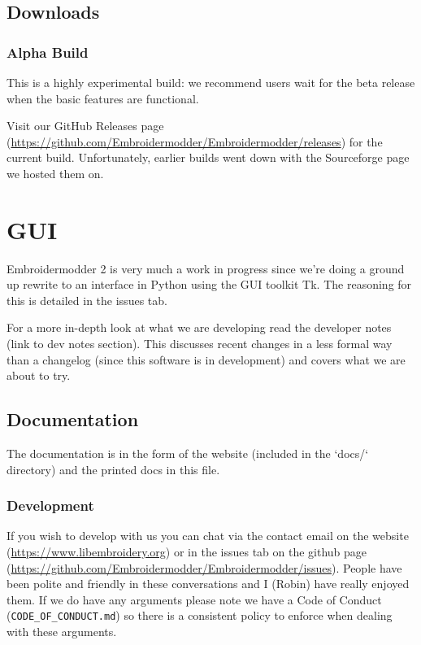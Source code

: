 \documentclass[10pt]{report}
\begin{document}
\section{Downloads}

\subsection{Alpha Build}

This is a highly experimental build: we recommend users wait for the beta
release when the basic features are functional.

Visit our  GitHub Releases page
(\url{https://github.com/Embroidermodder/Embroidermodder/releases})
for the current build. Unfortunately, earlier builds went down with the
Sourceforge page we hosted them on.

\chapter{GUI}

Embroidermodder 2 is very much a work in progress since we're doing a ground
up rewrite to an interface in Python using the GUI toolkit Tk. The reasoning for
this is detailed in the issues tab.

For a more in-depth look at what we are developing read the developer notes (link to dev notes
section). This discusses recent changes in a less formal way than a changelog (since this
software is in development) and covers what we are about to try.

\section{Documentation}

The documentation is in the form of the website
(included in the `docs/` directory) and the printed docs in this file.

\subsection{Development}

If you wish to develop with us you can chat via the contact email on the
website (\url{https://www.libembroidery.org}) or in the issues tab on the
github page (\url{https://github.com/Embroidermodder/Embroidermodder/issues}).
People have been polite and friendly in these conversations and I (Robin) have
really enjoyed them. If we do have any arguments please note we have a Code of
Conduct (\texttt{CODE\_OF\_CONDUCT.md}) so there is a consistent policy to enforce when
dealing with these arguments.
\end{document}
